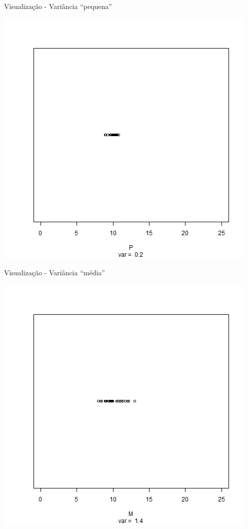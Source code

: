 \documentclass{beamer}
\begin{document}
\begin{frame}{Visualização - Variância ``pequena''}
  \begin{center}
    \includegraphics[height=.8\textheight]{Cap17/dot-P}
  \end{center}
\end{frame}

\begin{frame}{Visualização - Variância ``média''}
  \begin{center}
    \includegraphics[height=.8\textheight]{Cap17/dot-M}
  \end{center}
\end{frame}
\end{document}
